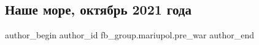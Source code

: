  
 
 
 
 

\subsection{Наше море, октябрь 2021 года}
\label{sec:11_02_2023.fb.fb_group.mariupol.pre_war.5.nashe_more__oktyabr_}

\ifcmt
 author_begin
   author_id fb_group.mariupol.pre_war
 author_end
\fi
